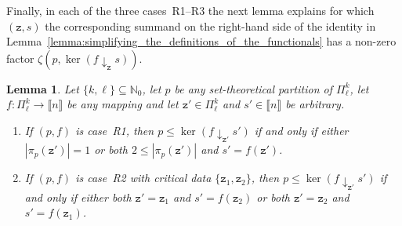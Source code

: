 \documentclass[10pt,a4paper]{amsart}
\numberwithin{equation}{section}
\newtheorem{Lemma}[Theorem]{Lemma}
\newcommand{\funcdef}{\colon}
\newcommand{\nnint}{{\mathbb{N}_0}}
\newcommand{\dwi}[1]{\llbracket{#1}\rrbracket}
\newcommand{\tsopx}[2]{\Pi^{#1}_{#2}}
\newcommand{\finerthan}{\mathrel{\leq}}
\newcommand{\Yp}[1]{\mathtt{#1}}
\newcommand{\Yb}[1]{\mathsf{#1}}
\newcommand{\blo}[2]{\pi_{#1}(#2)}
\newcommand{\zetf}{\zeta}
\newcommand{\zetfx}[2]{\zetf(#1,#2)}
\newcommand{\alterer}[3]{#1\downarrow_{#2}#3}
\newcommand{\thedim}{n}
\newcommand{\scenarioone}{R1}
\newcommand{\scenariotwo}{R2}
\newcommand{\scenariothree}{R3}
\begin{document}
{
  \newcommand{\thepartition}{p}
  \newcommand{\theind}{f}
  \newcommand{\ourpoint}{\Yp{z}}
  \newcommand{\ourvalue}{s}
  Finally, in each of the three cases~\scenarioone{}--\scenariothree{} the next lemma explains for which $(\ourpoint,\ourvalue)$ the corresponding summand on the right-hand side of the identity in Lem\-ma~\ref{lemma:simplifying_the_definitions_of_the_functionals} has a non-zero factor $\zetfx{\thepartition}{\ker(\alterer{\theind}{\ourpoint}{\ourvalue})}$.
}
  {
  \newcommand{\inlen}{k}
  \newcommand{\outlen}{\ell}
  \newcommand{\theind}{f}
  \newcommand{\theindx}[1]{f(#1)}
  \newcommand{\thepoint}{\Yp{z}}
  \newcommand{\thevalue}{s}
  \newcommand{\thepartition}{p}
  \newcommand{\thealtered}{\theind\downarrow_\thepoint\thevalue}
  \newcommand{\theblock}{\blo{\thepartition}{\thepoint}}
  \newcommand{\cutblock}{\blo{\thepartition}{\thepoint}\backslash \{\thepoint\}}
  \newcommand{\sing}{\{\thepoint\}}
  \newcommand{\thelong}{\Yb{Z}}
  \newcommand{\firstspecialpoint}{\Yp{z}_1}
  \newcommand{\secondspecialpoint}{\Yp{z}_2}
  \newcommand{\specialcounter}{i}
  \newcommand{\specialpoint}[1]{\Yp{z}_{#1}}
  \newcommand{\thegood}{f}
  \newcommand{\theonevalue}{s_1}
  \newcommand{\theothervalue}{s_2}
  \newcommand{\anypoint}{\Yp{y}}
  \newcommand{\someblock}{\Yb{A}}
  \newcommand{\anyblock}{\Yb{B}}
  \newcommand{\ourpoint}{\Yp{z'}}
  \newcommand{\ourvalue}{s'}
  \newcommand{\ouraltered}{\theind\downarrow_{\ourpoint}\ourvalue}
  \begin{Lemma}
    \label{lemma:easy-cohomology-helper-non-trivial-polynomials-two-points}
    Let  $\{\inlen,\outlen\}\subseteq \nnint$, let $\thepartition$  be any set-theo\-re\-ti\-cal partition of $\tsopx{\inlen}{\outlen}$, let $\theind\funcdef\tsopx{\inlen}{\outlen}\to\dwi{\thedim}$ be any mapping and let $\ourpoint\in\tsopx{\inlen}{\outlen}$ and $\ourvalue\in\dwi{\thedim}$ be arbitrary.
    \begin{enumerate}
    \item \label{lemma:easy-cohomology-helper-non-trivial-polynomials-two-points-1}
      If $(\thepartition,\theind)$ is case~\scenarioone{},
      then $\thepartition\finerthan \ker(\ouraltered)$ if and only if either $|\blo{\thepartition}{\ourpoint}|=1$ or  both $2\leq |\blo{\thepartition}{\ourpoint}|$ and  $\ourvalue=\theindx{\ourpoint}$.
    \item \label{lemma:easy-cohomology-helper-non-trivial-polynomials-two-points-2}
      If $(\thepartition,\theind)$ is case~\scenariotwo{} with critical data $\{\firstspecialpoint,\secondspecialpoint\}$,
      then $\thepartition\finerthan \ker(\ouraltered)$ if and only if either both $\ourpoint=\firstspecialpoint$ and $\ourvalue=\theindx{\secondspecialpoint}$ or both $\ourpoint=\secondspecialpoint$ and $\ourvalue=\theindx{\firstspecialpoint}$.

\end{enumerate}
\end{Lemma}}
\end{document}
